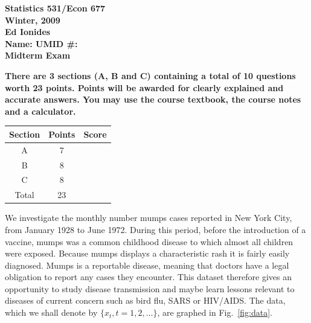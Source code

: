 \documentclass[11pt]{article}
\begin{document}
\begin{center}
{\bf Statistics 531/Econ 677\\

Winter, 2009\\

Ed Ionides\\
\vspace{7 mm}
Name: \hrulefill UMID \#: \hrulefill\\
\vspace{7 mm}
Midterm Exam}
\end{center}
{\bf There are 3 sections (A, B and C) containing a total of 10 questions worth 23 points. Points will be awarded for clearly explained and accurate answers. You may use the course textbook, the course notes and a calculator.


}
\begin{center}
\renewcommand{\arraystretch}{2}
\begin{tabular}{||c|c|c||}
\hline
\hline
{Section} & {Points} & {Score}\\
\hline
\hline
A & 7 & \\
\hline
B & 8 & \\
\hline
C & 8 & \\
\hline
\hline
Total & 23 &  \\
\hline
\hline
\end{tabular}
\end{center}
\newpage

We investigate the monthly number mumps cases reported in New York City,
 from January 1928 to June 1972. 
During this period, before the introduction of a vaccine, mumps was a common childhood disease to which almost all children were exposed.
Because mumps displays a characteristic rash it is fairly easily diagnosed. Mumps is a reportable disease, meaning that doctors have  a legal obligation to report any cases they encounter.
This dataset therefore gives an opportunity to study disease transmission and maybe learn lessons relevant to diseases of current concern such as bird flu, SARS or HIV/AIDS.
The data, which we shall denote by $\{x_t,t=1,2,\dots\}$, are graphed in Fig.~\ref{fig:data}.
\end{document}
